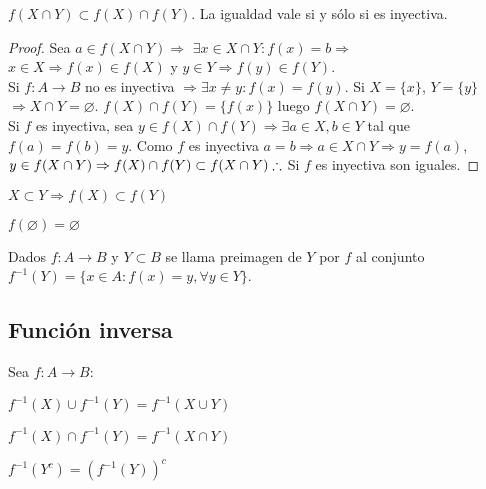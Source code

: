 \begin{prop}
    $f(X \cap Y) \subset f(X) \cap f(Y)$. La igualdad vale si y sólo si es inyectiva.
    \begin{proof}
        Sea $a \in f(X \cap Y) \Rightarrow $ $\exists x \in X \cap Y : f(x) = b \Rightarrow$ $ x \in X \Rightarrow f(x) \in f(X) $ y $ y \in Y \Rightarrow f(y) \in f(Y). $ \\ Si $f: A \to B$ no es inyectiva $\Rightarrow \exists x \neq y : f(x) = f(y)$. Si $X = \{x\}$, $Y = \{y\}$ $\Rightarrow X \cap Y = \varnothing$. $f(X) \cap f(Y) = \{f(x)\}$ luego $f(X \cap Y) = \varnothing$. \\ Si $f$ es inyectiva, sea $y \in f(X) \cap f(Y) \Rightarrow \exists a \in X, b \in Y$ tal que $f(a) = f(b) = y$. Como $f$ es inyectiva $a = b \Rightarrow a \in X \cap Y \Rightarrow y = f(a)$, $y \in f(X \cap Y) \Rightarrow f(X) \cap f(Y) \subset f(X \cap Y) \\
        \therefore$ Si $f$ es inyectiva son iguales.
    \end{proof}
\end{prop}


\begin{prop}
    $X \subset Y \Rightarrow f(X) \subset f(Y)$ 
\end{prop}

\begin{prop}
    $f(\varnothing) = \varnothing$
\end{prop}

\begin{definition}
    Dados $f: A \to B$ y $Y \subset B$ se llama preimagen de $Y$ por $f$ al conjunto $f^{-1}(Y) = \{x \in A : f(x) = y, \forall y \in Y\}$.
\end{definition}

\subsection{Función inversa}

Sea $f: A \to B$:

\begin{prop}
    $f^{-1}(X) \cup f^{-1}(Y) = f^{-1}(X \cup Y)$
\end{prop}

\begin{prop}
    $f^{-1}(X) \cap f^{-1}(Y) = f^{-1}(X \cap Y)$
\end{prop}

\begin{prop}
    $f^{-1}(Y^c) = (f^{-1}(Y))^c$
\end{prop}

